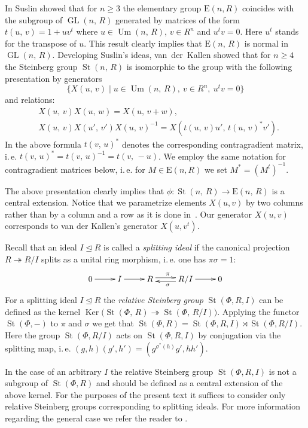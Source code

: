 \documentclass[11pt]{amsart}
\theoremstyle{plain} \declaretheorem[name=Theorem, Refname={Theorem,Theorems}]{tm} \Crefname{tm}{Theorem}{Theorems}
\numberwithin{equation}{section}
\theoremstyle{definition} \newtheorem{df}[lm]{Definition} \Crefname{df}{Definition}{Definitions}
\theoremstyle{remark} \newtheorem{rk}[lm]{Remark} \Crefname{rk}{Remark}{Remarks}
\newcommand{\Ker}{\mathop{\mathrm{Ker}}\nolimits}
\newcommand{\E}{{\mathrm{E}}}
\newcommand{\Um}{\mathop{\mathrm{Um}}\nolimits}
\newcommand{\St}{\mathop{\mathrm{St}}\nolimits}
\newcommand{\GL}{\mathop{\mathrm{GL}}\nolimits}
\newcommand{\epi}{\twoheadrightarrow}
\newcommand{\inv}{^{-1}}
\begin{document}
In \cite{Sus} Suslin showed that for $n\geq 3$ the elementary group $\E(n, R)$ coincides with the subgroup of $\GL(n,\,R)$ generated by matrices
of the form $t(u,\,v)=1+uv^t$ where $u\in\Um(n,\,R)$, $v\in R^n$ and $u^tv=0$. Here $u^t$ stands for the transpose of $u$.
This result clearly implies that $\E(n,\,R)$ is normal in $\GL(n,\,R)$.
Developing Suslin's ideas, van~der~Kallen showed that for $n\geq4$ the Steinberg group $\St(n,\,R)$ is isomorphic to the group with the following presentation by generators
$$\{X(u,\,v)\mid u\in\Um(n,\,R),\ v\in R^n,\ u^tv=0\}$$ and relations:
\setcounter{equation}{0} \renewcommand{\theequation}{K\arabic{equation}}
\begin{align}
&X(u,\,v)X(u,\,w)=X(u,\,v+w), \label{add1} \\
&X(u,\,v)X(u',\,v')X(u,\,v)\inv=X(t(u,\,v)u',\,t(u,\,v)^* v'). \label{conj1}
\end{align}
In the above formula $t(v,\,u)^*$ denotes the corresponding contragradient matrix, i.\,e. $t(v,\,u)^* = t(v,\,u)\inv = t(v,\,-u)$.
We employ the same notation for contragradient matrices below, i.\,e. for $M\in\E(n,R)$ we set $M^* = (M^t)\inv$.

The above presentation clearly implies that $\phi\colon\St(n,\,R)\rightarrow\E(n,\,R)$ is a central extension.
Notice that we parametrize elements $X(u, v)$ by two columns rather than by a column and a row as it is done in~\cite{vdK}.
Our generator $X(u,v)$ corresponds to van der Kallen's generator $X(u, v^t)$.

Recall that an ideal $I\trianglelefteq R$ is called a \emph{splitting ideal} if the canonical projection $R \twoheadrightarrow R/I$ splits as a unital ring morphism, i.\,e. one has $\pi\sigma=1$:
$$\xymatrix{0\ar@<0.1ex>[r]^{}&I\ar@<0.1ex>[r]^{}&R\ar@<0.5ex>[r]^{\pi}&R/I\ar@<0.5ex>[l]^{\sigma}\ar@<0.1ex>[r]^{}&0}$$
For a splitting ideal $I\trianglelefteq R$ the \emph{relative Steinberg group} $\St(\Phi, R, I)$ can be defined as the kernel $\Ker\big(\St(\Phi,\,R)\epi\St(\Phi,\,R/I)\big)$.
Applying the functor $\St(\Phi, -)$ to $\pi$ and $\sigma$ we get that $\St(\Phi, R) = \St(\Phi, R, I) \rtimes \St(\Phi, R/I)$.
Here the group $\St(\Phi, R/I)$ acts on $\St(\Phi, R, I)$ by conjugation via the splitting map, i.\,e. $(g, h) (g',h') = (g {}^{\sigma^*(h)}g', hh')$.

In the case of an arbitrary $I$ the relative Steinberg group $\St(\Phi, R, I)$ is not a subgroup of $\St(\Phi, R)$ and should be defined as a central extension of the above kernel.
For the purposes of the present text it suffices to consider only relative Steinberg groups corresponding to splitting ideals.
For more information regarding the general case we refer the reader to \cite[Section~3]{SCh}.
\end{document}
